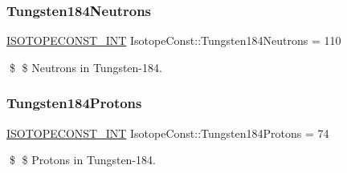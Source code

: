 \subsubsection{\texorpdfstring{Tungsten184\+Neutrons}{Tungsten184Neutrons}}
{\footnotesize\ttfamily \mbox{\hyperlink{group___isotope_const-_macros_ga5f18360b3e99483a35c32d789e62621c}{I\+S\+O\+T\+O\+P\+E\+C\+O\+N\+S\+T\+\_\+\+I\+NT}} Isotope\+Const\+::\+Tungsten184\+Neutrons = 110}

\$ \$ Neutrons in Tungsten-\/184. \mbox{\label{group___isotope_const-_tungsten-_w184_gae31244fbf6a149194be5cebf3f51c16a}} 
\subsubsection{\texorpdfstring{Tungsten184\+Protons}{Tungsten184Protons}}
{\footnotesize\ttfamily \mbox{\hyperlink{group___isotope_const-_macros_ga5f18360b3e99483a35c32d789e62621c}{I\+S\+O\+T\+O\+P\+E\+C\+O\+N\+S\+T\+\_\+\+I\+NT}} Isotope\+Const\+::\+Tungsten184\+Protons = 74}

\$ \$ Protons in Tungsten-\/184. 